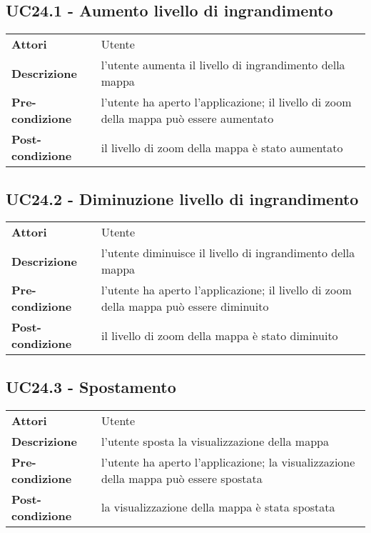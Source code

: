 \subsection{UC24.1 - Aumento livello di ingrandimento}
\label{sssec:UC24.1}
\def\arraystretch{1.5}
\begin{tabularx}{\textwidth}{l|p{}}
\rowcolor{I} \multicolumn{2}{c}{\color{white}\textbf{UC24.1 - Aumenta livello di ingrandimento}} \\
\toprule
\endhead
\textbf{Attori} & Utente\\
\textbf{Descrizione} & l'utente aumenta il livello di ingrandimento della mappa\\
\textbf{Pre-condizione} & l'utente ha aperto l'applicazione; il livello di zoom della mappa può essere aumentato\\
\textbf{Post-condizione} & il livello di zoom della mappa è stato aumentato\\
\bottomrule
\end{tabularx}
\subsection{UC24.2 - Diminuzione livello di ingrandimento}
\label{sssec:UC24.2}
\def\arraystretch{1.5}
\begin{tabularx}{\textwidth}{l|p{}}
\rowcolor{I} \multicolumn{2}{c}{\color{white}\textbf{UC24.2 - Diminuzione livello di ingrandimento}} \\
\toprule
\endhead
\textbf{Attori} & Utente\\
\textbf{Descrizione} & l'utente diminuisce il livello di ingrandimento della mappa\\
\textbf{Pre-condizione} & l'utente ha aperto l'applicazione; il livello di zoom della mappa può essere diminuito\\
\textbf{Post-condizione} & il livello di zoom della mappa è stato diminuito\\
\bottomrule
\end{tabularx}
\subsection{UC24.3 - Spostamento}
\label{sssec:UC24.3}
\def\arraystretch{1.5}
\begin{tabularx}{\textwidth}{l|p{}}
\rowcolor{I} \multicolumn{2}{c}{\color{white}\textbf{UC24.3 - Spostamento}} \\
\toprule
\endhead
\textbf{Attori} & Utente\\
\textbf{Descrizione} & l'utente sposta la visualizzazione della mappa\\
\textbf{Pre-condizione} & l'utente ha aperto l'applicazione; la visualizzazione della mappa può essere spostata\\
\textbf{Post-condizione} & la visualizzazione della mappa è stata spostata\\
\bottomrule
\end{tabularx}

